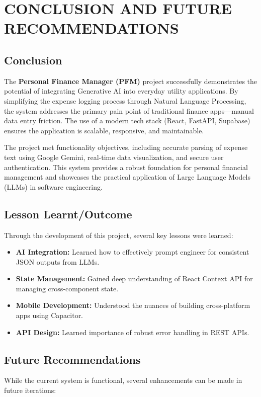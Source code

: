 \chapter{CONCLUSION AND FUTURE RECOMMENDATIONS}

\section{Conclusion}
The \textbf{Personal Finance Manager (PFM)} project successfully demonstrates the potential of integrating Generative AI into everyday utility applications. By simplifying the expense logging process through Natural Language Processing, the system addresses the primary pain point of traditional finance apps---manual data entry friction. The use of a modern tech stack (React, FastAPI, Supabase) ensures the application is scalable, responsive, and maintainable.

The project met functionality objectives, including accurate parsing of expense text using Google Gemini, real-time data visualization, and secure user authentication. This system provides a robust foundation for personal financial management and showcases the practical application of Large Language Models (LLMs) in software engineering.

\section{Lesson Learnt/Outcome}
Through the development of this project, several key lessons were learned:
\begin{itemize}
    \item \textbf{AI Integration:} Learned how to effectively prompt engineer for consistent JSON outputs from LLMs.
    \item \textbf{State Management:} Gained deep understanding of React Context API for managing cross-component state.
    \item \textbf{Mobile Development:} Understood the nuances of building cross-platform apps using Capacitor.
    \item \textbf{API Design:} Learned importance of robust error handling in REST APIs.
\end{itemize}

\section{Future Recommendations}
While the current system is functional, several enhancements can be made in future iterations:

